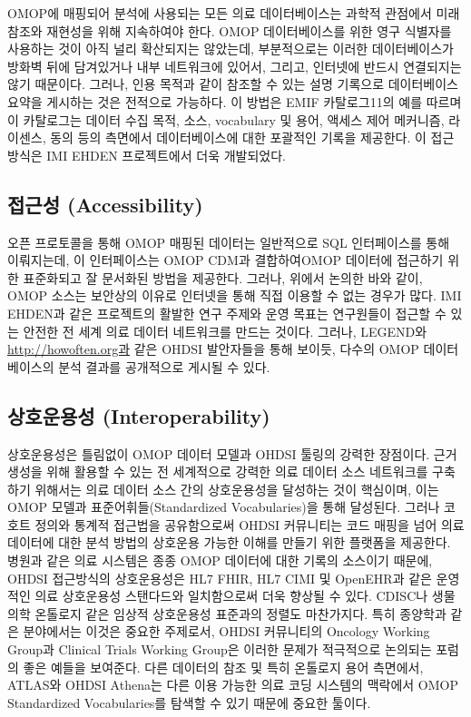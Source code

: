 \documentclass[11pt]{book}
\theoremstyle{definition}
\theoremstyle{definition}
\theoremstyle{definition}
\theoremstyle{remark}
\begin{document}
OMOP에 매핑되어 분석에 사용되는 모든 의료 데이터베이스는 과학적 관점에서
미래 참조와 재현성을 위해 지속하여야 한다. OMOP 데이터베이스를 위한 영구
식별자를 사용하는 것이 아직 널리 확산되지는 않았는데, 부분적으로는
이러한 데이터베이스가 방화벽 뒤에 담겨있거나 내부 네트워크에 있어서,
그리고, 인터넷에 반드시 연결되지는 않기 때문이다. 그러나, 인용 목적과
같이 참조할 수 있는 설명 기록으로 데이터베이스 요약을 게시하는 것은
전적으로 가능하다. 이 방법은 EMIF 카탈로그11의 예를 따르며 이 카탈로그는
데이터 수집 목적, 소스, vocabulary 및 용어, 액세스 제어 메커니즘,
라이센스, 동의 등의 측면에서 데이터베이스에 대한 포괄적인 기록을
제공한다. \citep{Oliveira2019} 이 접근 방식은 IMI EHDEN 프로젝트에서
더욱 개발되었다.

\subsection{접근성 (Accessibility)}\label{-accessibility}

오픈 프로토콜을 통해 OMOP 매핑된 데이터는 일반적으로 SQL 인터페이스를
통해 이뤄지는데, 이 인터페이스는 OMOP CDM과 결합하여OMOP 데이터에
접근하기 위한 표준화되고 잘 문서화된 방법을 제공한다. 그러나, 위에서
논의한 바와 같이, OMOP 소스는 보안상의 이유로 인터넷을 통해 직접 이용할
수 없는 경우가 많다. IMI EHDEN과 같은 프로젝트의 활발한 연구 주제와 운영
목표는 연구원들이 접근할 수 있는 안전한 전 세계 의료 데이터 네트워크를
만드는 것이다. 그러나, LEGEND와 \url{http://howoften.org과} 같은 OHDSI
발안자들을 통해 보이듯, 다수의 OMOP 데이터베이스의 분석 결과를
공개적으로 게시될 수 있다.

\subsection{상호운용성 (Interoperability)}\label{-interoperability}

상호운용성은 틀림없이 OMOP 데이터 모델과 OHDSI 툴링의 강력한 장점이다.
근거 생성을 위해 활용할 수 있는 전 세계적으로 강력한 의료 데이터 소스
네트워크를 구축하기 위해서는 의료 데이터 소스 간의 상호운용성을 달성하는
것이 핵심이며, 이는 OMOP 모델과 표준어휘들(Standardized Vocabularies)을
통해 달성된다. 그러나 코호트 정의와 통계적 접근법을 공유함으로써 OHDSI
커뮤니티는 코드 매핑을 넘어 의료 데이터에 대한 분석 방법의 상호운용
가능한 이해를 만들기 위한 플랫폼을 제공한다. 병원과 같은 의료 시스템은
종종 OMOP 데이터에 대한 기록의 소스이기 때문에, OHDSI 접근방식의
상호운용성은 HL7 FHIR, HL7 CIMI 및 OpenEHR과 같은 운영적인 의료
상호운용성 스탠다드와 일치함으로써 더욱 향상될 수 있다. CDISC나 생물의학
온톨로지 같은 임상적 상호운용성 표준과의 정렬도 마찬가지다. 특히
종양학과 같은 분야에서는 이것은 중요한 주제로서, OHDSI 커뮤니티의
Oncology Working Group과 Clinical Trials Working Group은 이러한 문제가
적극적으로 논의되는 포럼의 좋은 예들을 보여준다. 다른 데이터의 참조 및
특히 온톨로지 용어 측면에서, ATLAS와 OHDSI Athena는 다른 이용 가능한
의료 코딩 시스템의 맥락에서 OMOP Standardized Vocabularies를 탐색할 수
있기 때문에 중요한 툴이다.
\end{document}
